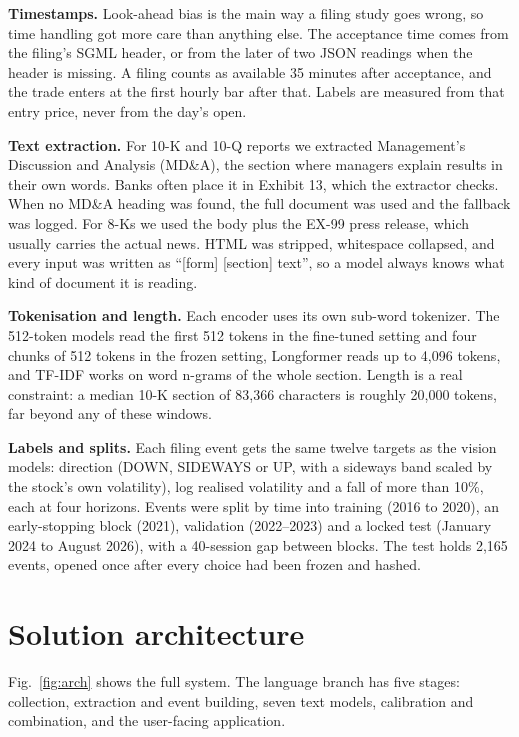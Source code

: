 \documentclass[11pt,a4paper]{article}
\begin{document}
\textbf{Timestamps.} Look-ahead bias is the main way a filing study goes wrong, so time handling got more care than anything else. The acceptance time comes from the filing's SGML header, or from the later of two JSON readings when the header is missing. A filing counts as available 35 minutes after acceptance, and the trade enters at the first hourly bar after that. Labels are measured from that entry price, never from the day's open.

\textbf{Text extraction.} For 10-K and 10-Q reports we extracted Management's Discussion and Analysis (MD\&A), the section where managers explain results in their own words. Banks often place it in Exhibit 13, which the extractor checks. When no MD\&A heading was found, the full document was used and the fallback was logged. For 8-Ks we used the body plus the EX-99 press release, which usually carries the actual news. HTML was stripped, whitespace collapsed, and every input was written as ``[form] [section] text'', so a model always knows what kind of document it is reading.

\textbf{Tokenisation and length.} Each encoder uses its own sub-word tokenizer. The 512-token models read the first 512 tokens in the fine-tuned setting and four chunks of 512 tokens in the frozen setting, Longformer reads up to 4,096 tokens, and TF-IDF works on word n-grams of the whole section. Length is a real constraint: a median 10-K section of 83,366 characters is roughly 20,000 tokens, far beyond any of these windows.

\textbf{Labels and splits.} Each filing event gets the same twelve targets as the vision models: direction (DOWN, SIDEWAYS or UP, with a sideways band scaled by the stock's own volatility), log realised volatility and a fall of more than 10\%, each at four horizons. Events were split by time into training (2016 to 2020), an early-stopping block (2021), validation (2022--2023) and a locked test (January 2024 to August 2026), with a 40-session gap between blocks. The test holds 2,165 events, opened once after every choice had been frozen and hashed.

\section{Solution architecture}

Fig.~\ref{fig:arch} shows the full system. The language branch has five stages: collection, extraction and event building, seven text models, calibration and combination, and the user-facing application.
\end{document}
